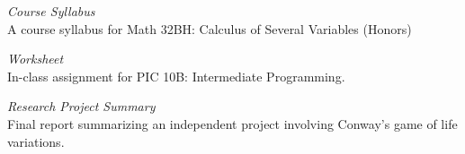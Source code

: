 \documentclass[margin, 10pt]{res} %
\begin{document}
\textit{Course Syllabus} \\
A course syllabus for Math 32BH: Calculus of Several Variables (Honors)

\textit{Worksheet} \\
In-class assignment for PIC 10B: Intermediate Programming.

\textit{Research Project Summary} \\
Final report summarizing an independent project involving Conway's game of life variations.









\end{document}
